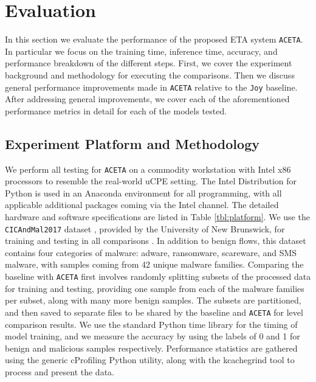 \section{Evaluation}
\label{sec:eval}
In this section we evaluate the performance of the proposed ETA system \texttt{ACETA}. In particular we focus on the training time, inference time, accuracy, and performance breakdown of the different steps. First, we cover the experiment background and methodology for executing the comparisons. Then we discuss general performance improvements made in \texttt{ACETA} relative to the \texttt{Joy} baseline. After addressing general improvements, we cover each of the aforementioned performance metrics in detail for each of the models tested.  

\subsection{Experiment Platform and Methodology}
We perform all testing for \texttt{ACETA} on a commodity workstation with Intel x86 processors to resemble the real-world uCPE setting. The Intel Distribution for Python is used in an Anaconda environment for all programming, with all applicable additional packages coming via the Intel channel. The detailed hardware and software specifications are listed in Table \ref{tbl:platform}. We use the \texttt{CICAndMal2017} dataset \cite{cicandmal2017}, provided by the University of New Brunswick, for training and testing in all comparisons . In addition to benign flows, this dataset contains four categories of malware: adware, ransomware, scareware, and SMS malware, with samples coming from 42 unique malware families. Comparing the baseline with \texttt{ACETA} first involves randomly splitting subsets of the processed data for training and testing, providing one sample from each of the malware families per subset, along with many more benign samples. The subsets are partitioned, and then saved to separate files to be shared by the baseline and \texttt{ACETA} for level comparison results. We use the standard Python time library for the timing of model training, and we measure the accuracy by using the labels of 0 and 1 for benign and malicious samples respectively. Performance statistics are gathered using the generic cProfiling Python utility, along with the kcachegrind tool \cite{kcachegrind} to process and present the data. 


